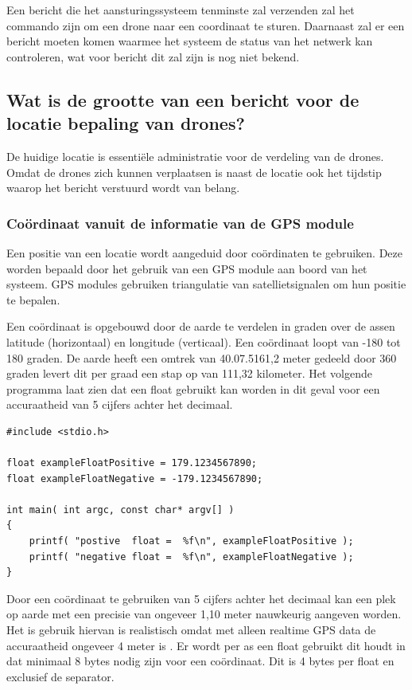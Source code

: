 \documentclass[a4paper, 11pt, oneside]{report}
\begin{document}
Een bericht die het aansturingssysteem tenminste zal verzenden zal het commando zijn om een drone naar een coordinaat te sturen.
Daarnaast zal er een bericht moeten komen waarmee het systeem de status van het netwerk kan controleren, wat voor bericht dit zal zijn is nog niet bekend.


\subsection{Wat is de grootte van een bericht voor de locatie bepaling van drones?}
\label{sub:locatie}
De huidige locatie is essentiële administratie voor de verdeling van de drones.
Omdat de drones zich kunnen verplaatsen is naast de locatie ook het tijdstip waarop het bericht verstuurd wordt van belang.

\subsubsection{Coördinaat vanuit de informatie van de GPS module}
Een positie van een locatie wordt aangeduid door coördinaten te gebruiken.
Deze worden bepaald door het gebruik van een GPS module aan boord van het systeem.
GPS modules gebruiken triangulatie van satellietsignalen om hun positie te bepalen.  

Een coördinaat is opgebouwd door de aarde te verdelen in graden over de assen latitude (horizontaal) en longitude (verticaal).
Een coördinaat loopt van -180 tot 180 graden.
De aarde heeft een omtrek van 40.07.5161,2 meter gedeeld door 360 graden levert dit per graad een stap op van 111,32 kilometer. 
Het volgende programma laat zien dat een float gebruikt kan worden in dit geval voor een accuraatheid van 5 cijfers achter het decimaal.

\begin{lstlisting}
#include <stdio.h>

float exampleFloatPositive = 179.1234567890;
float exampleFloatNegative = -179.1234567890;

int main( int argc, const char* argv[] )
{
	printf( "postive  float =  %f\n", exampleFloatPositive );
	printf( "negative float =  %f\n", exampleFloatNegative );
}
\end{lstlisting}
 
Door een coördinaat te gebruiken van 5 cijfers achter het decimaal kan een plek op aarde met een precisie van ongeveer 1,10 meter nauwkeurig aangeven worden.
Het is gebruik hiervan is realistisch omdat met alleen realtime GPS data de accuraatheid ongeveer 4 meter is \cite{GPSaccu}.
Er wordt per as een float gebruikt dit houdt in dat minimaal 8 bytes nodig zijn voor een coördinaat.
Dit is 4 bytes per float en exclusief de separator. 
\end{document}
